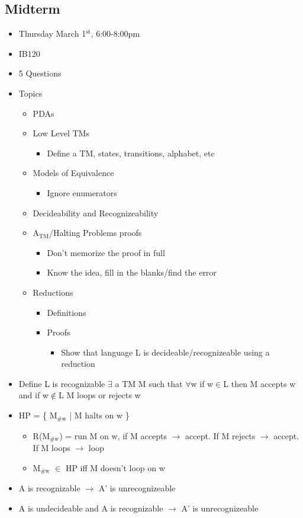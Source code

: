 \documentclass[11pt]{article}
\begin{document}
\subsection{Midterm}
\label{sec:org62cf339}
\begin{itemize}
\item Thursday March 1\(^{\text{st}}\), 6:00-8:00pm
\item IB120
\item 5 Questions
\item Topics
\begin{itemize}
\item PDAs
\item Low Level TMs
\begin{itemize}
\item Define a TM, states, transitions, alphabet, etc
\end{itemize}
\item Models of Equivalence
\begin{itemize}
\item Ignore enumerators
\end{itemize}
\item Decideability and Recognizeability
\item A\(_{\text{TM}}\)/Halting Problems proofs
\begin{itemize}
\item Don't memorize the proof in full
\item Know the idea, fill in the blanks/find the error
\end{itemize}
\item Reductions
\begin{itemize}
\item Definitions
\item Proofs 
\begin{itemize}
\item Show that language L is decideable/recognizeable using a reduction
\end{itemize}
\end{itemize}
\end{itemize}
\item Define L is recognizable
\(\exists\) a TM M such that \(\forall\)w if w\(\in\)L then M accepts w and if w\(\notin\)L M loops or rejects w
\item HP = \{ M\(_{\text{\#w}}\) | M halts on w \}
\begin{itemize}
\item R(M\(_{\text{\#w}}\)) = run M on w, if M accepts \(\rightarrow\) accept. If M rejects \(\rightarrow\) accept. If M loops \(\rightarrow\) loop
\item M\(_{\text{\#w}}\) \(\in\) HP iff M doesn't loop on w
\end{itemize}
\item A is recognizable \textlnot{}\(\rightarrow\) A' is unrecognizeable
\item A is undecideable and A is recognizable \(\rightarrow\) A' is unrecognizeable
\end{itemize}
\end{document}
